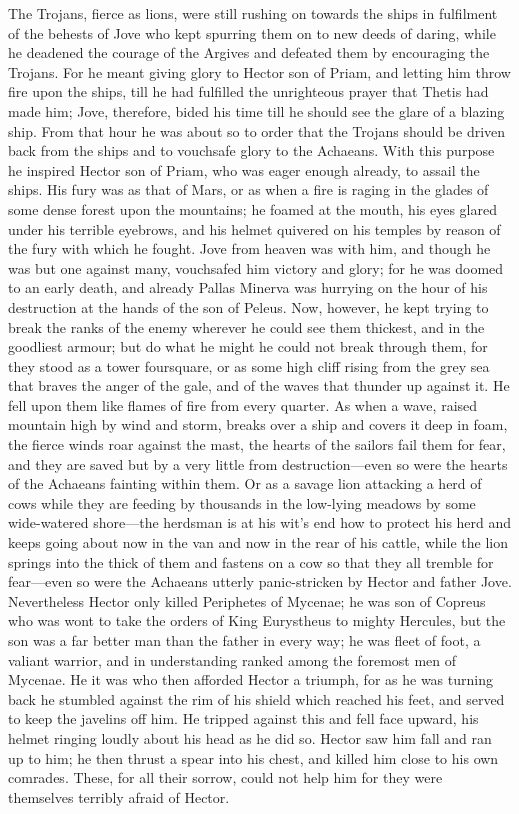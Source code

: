 The Trojans, fierce as lions, were still rushing on towards the ships in
fulfilment of the behests of Jove who kept spurring them on to new deeds
of daring, while he deadened the courage of the Argives and defeated them
by encouraging the Trojans. For he meant giving glory to Hector son of
Priam, and letting him throw fire upon the ships, till he had fulfilled
the unrighteous prayer that Thetis had made him; Jove, therefore, bided
his time till he should see the glare of a blazing ship. From that hour he
was about so to order that the Trojans should be driven back from the
ships and to vouchsafe glory to the Achaeans. With this purpose he
inspired Hector son of Priam, who was eager enough already, to assail the
ships. His fury was as that of Mars, or as when a fire is raging in the
glades of some dense forest upon the mountains; he foamed at the mouth,
his eyes glared under his terrible eyebrows, and his helmet quivered on
his temples by reason of the fury with which he fought. Jove from heaven
was with him, and though he was but one against many, vouchsafed him
victory and glory; for he was doomed to an early death, and already Pallas
Minerva was hurrying on the hour of his destruction at the hands of the
son of Peleus. Now, however, he kept trying to break the ranks of the
enemy wherever he could see them thickest, and in the goodliest armour;
but do what he might he could not break through them, for they stood as a
tower foursquare, or as some high cliff rising from the grey sea that
braves the anger of the gale, and of the waves that thunder up against it.
He fell upon them like flames of fire from every quarter. As when a wave,
raised mountain high by wind and storm, breaks over a ship and covers it
deep in foam, the fierce winds roar against the mast, the hearts of the
sailors fail them for fear, and they are saved but by a very little from
destruction—even so were the hearts of the Achaeans fainting within
them. Or as a savage lion attacking a herd of cows while they are feeding
by thousands in the low-lying meadows by some wide-watered shore—the
herdsman is at his wit’s end how to protect his herd and keeps going about
now in the van and now in the rear of his cattle, while the lion springs
into the thick of them and fastens on a cow so that they all tremble for
fear—even so were the Achaeans utterly panic-stricken by Hector and
father Jove. Nevertheless Hector only killed Periphetes of Mycenae; he was
son of Copreus who was wont to take the orders of King Eurystheus to
mighty Hercules, but the son was a far better man than the father in every
way; he was fleet of foot, a valiant warrior, and in understanding ranked
among the foremost men of Mycenae. He it was who then afforded Hector a
triumph, for as he was turning back he stumbled against the rim of his
shield which reached his feet, and served to keep the javelins off him. He
tripped against this and fell face upward, his helmet ringing loudly about
his head as he did so. Hector saw him fall and ran up to him; he then
thrust a spear into his chest, and killed him close to his own comrades.
These, for all their sorrow, could not help him for they were themselves
terribly afraid of Hector.

